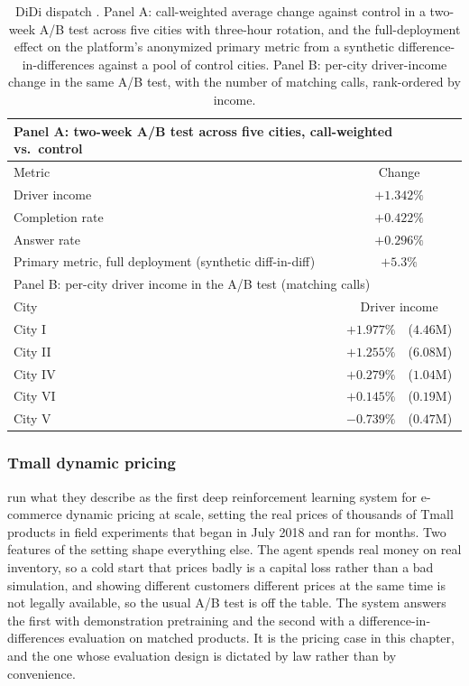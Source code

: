 \begin{table}[t]
\centering
\small
\begin{tabular}{lc}
\toprule
\multicolumn{2}{l}{Panel A: two-week A/B test across five cities, call-weighted vs.\ control} \\
\midrule
Metric & Change \\
\midrule
Driver income & $+1.342\%$ \\
Completion rate & $+0.422\%$ \\
Answer rate & $+0.296\%$ \\
Primary metric, full deployment (synthetic diff-in-diff) & $+5.3\%$ \\
\midrule
\multicolumn{2}{l}{Panel B: per-city driver income in the A/B test (matching calls)} \\
\midrule
City & Driver income \\
\midrule
City I & $+1.977\%$\ \ ($4.46$M) \\
City II & $+1.255\%$\ \ ($6.08$M) \\
City IV & $+0.279\%$\ \ ($1.04$M) \\
City VI & $+0.145\%$\ \ ($0.19$M) \\
City V & $-0.739\%$\ \ ($0.47$M) \\
\bottomrule
\end{tabular}
\caption{DiDi dispatch \citep{SadeghiEshkevari2022DiDiScalable}. Panel A: call-weighted average change against control in a two-week A/B test across five cities with three-hour rotation, and the full-deployment effect on the platform's anonymized primary metric from a synthetic difference-in-differences against a pool of control cities. Panel B: per-city driver-income change in the same A/B test, with the number of matching calls, rank-ordered by income.}
\label{tab:didi_results}
\end{table}

\subsubsection{Tmall dynamic pricing}
\label{sec:ecommerce_pricing}
\citet{Liu2019} run what they describe as the first deep reinforcement learning system for e-commerce dynamic pricing at scale, setting the real prices of thousands of Tmall products in field experiments that began in July 2018 and ran for months. Two features of the setting shape everything else. The agent spends real money on real inventory, so a cold start that prices badly is a capital loss rather than a bad simulation, and showing different customers different prices at the same time is not legally available, so the usual A/B test is off the table. The system answers the first with demonstration pretraining and the second with a difference-in-differences evaluation on matched products. It is the pricing case in this chapter, and the one whose evaluation design is dictated by law rather than by convenience.

